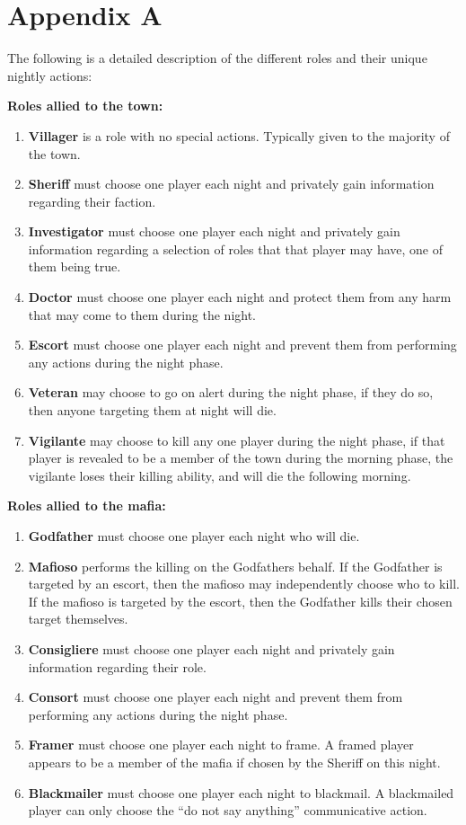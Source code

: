 \section{Appendix A}\label{app:A}
The following is a detailed description of the different roles and their unique
nightly actions:

\textbf{Roles allied to the town:}
\begin{enumerate}
	\item\textbf{Villager} is a  role with no special actions. Typically given to the majority of the town.
	\item\textbf{Sheriff} must choose one player each night and privately gain information regarding their faction.
	\item\textbf{Investigator} must choose one player each night and privately gain information regarding a selection of roles that that player may have, one of them being true.
	\item\textbf{Doctor} must choose one player each night and protect them from any harm that may come to them during the night.
	\item\textbf{Escort} must choose one player each night and prevent them from performing any actions during the night phase.
	\item\textbf{Veteran} may choose to go on alert during the night phase, if they do so, then anyone targeting them at night will die.
	\item\textbf{Vigilante} may choose to kill any one player during the night phase, if that player is revealed to be a member of the town during the morning phase, the vigilante loses their killing ability, and will die the following morning.
\end{enumerate}
\textbf{Roles allied to the mafia:}
\begin{enumerate}
	\item\textbf{Godfather} must choose one player each night who will die.
	\item\textbf{Mafioso} performs the killing on the Godfathers behalf. If the Godfather is targeted by an escort, then the mafioso may independently choose who to kill. If the mafioso is targeted by the escort, then the Godfather kills their chosen target themselves.
	\item\textbf{Consigliere} must choose one player each night and privately gain information regarding their role.
	\item\textbf{Consort} must choose one player each night and prevent them from performing any actions during the night phase.
	\item\textbf{Framer} must choose one player each night to frame. A framed player appears to be a member of the mafia if chosen by the Sheriff on this night.
	\item\textbf{Blackmailer} must choose one player each night to blackmail. A blackmailed player can only choose the “do not say anything” communicative action.
\end{enumerate}